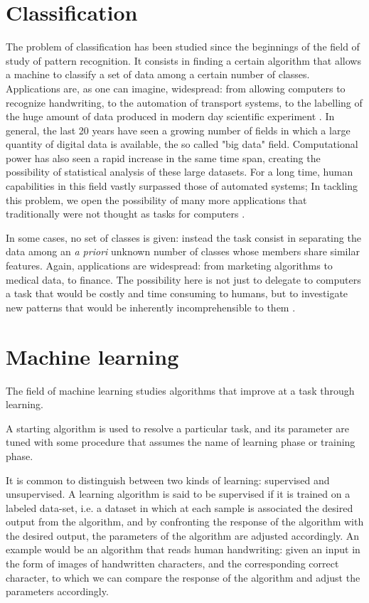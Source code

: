 \documentclass[a4paper]{report}
\begin{document}
\section{Classification}
The problem of classification has been studied since the beginnings of the field of study of pattern recognition.
It consists in finding a certain algorithm that allows a machine to classify a set of data among a certain number of classes.
Applications are, as one can imagine, widespread:
from allowing computers to recognize handwriting, to the automation of transport systems, to the labelling of the huge amount of data produced in modern day scientific experiment \cite{hand1997statistical}.
In general, the last 20 years have seen a growing number of fields in which a large quantity of digital data is available, the so called "big data" field.
Computational power has also seen a rapid increase in the same time span, creating the possibility of statistical analysis of these large datasets.
For a long time, human capabilities in this field vastly surpassed those of automated systems;
In tackling this problem, we open the possibility of many more applications that traditionally were not thought as  tasks for computers \cite{marx2013big}.

In some cases, no set of classes is given:
instead the task consist in separating the data among an \textit{a priori} unknown number of classes whose members share similar features.
Again, applications are widespread:
from marketing algorithms to medical data, to finance.
The possibility here is not just to delegate to computers a task that would be costly and time consuming to humans, but to investigate new patterns that would be inherently incomprehensible to them \cite{magoulas1999machine}.

\section{Machine learning}
The field of machine learning studies algorithms that improve at a task through learning.

A starting algorithm is used to resolve a particular task, and its parameter are tuned with some procedure that assumes the name of learning phase or training phase.

It is common to distinguish between two kinds of learning:
supervised and unsupervised.
A learning algorithm is said to be supervised if it is trained on a labeled data-set, i.e.
a dataset in which at each sample is associated the desired output from the algorithm, and by confronting the response of the algorithm with the desired output, the parameters of the algorithm are adjusted accordingly.
An example would be an algorithm that reads human handwriting:
given an input in the form of images of handwritten characters, and the corresponding correct character, to which we can compare the response of the algorithm and adjust the parameters accordingly.
\end{document}
